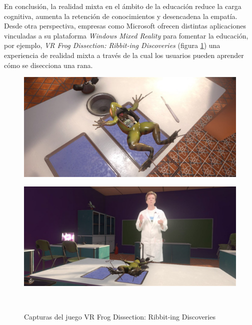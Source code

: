 En conclusión, la realidad mixta en el ámbito de la educación reduce la carga cognitiva, aumenta la retención de conocimientos y desencadena la empatía.\\




Desde otra perspectiva, empresas como Microsoft ofrecen distintas aplicaciones vinculadas a su plataforma \textit{Windows Mixed Reality} para fomentar la educación, por ejemplo, \textit{VR Frog Dissection: Ribbit-ing Discoveries} (figura \ref{fig:vrfrogdissectioncapturas}) una experiencia de realidad mixta a través de la cual los usuarios pueden aprender cómo se disecciona una rana.

\begin{figure}[htbp]
\centering
    \hspace{-4mm}
    \begin{minipage}{0.5\textwidth}
        \centering
        \includegraphics[scale=0.16]{Images/Estado del arte/frogDisection1.jpeg}\\
    \end{minipage}
    \begin{minipage}{0.5\textwidth}
        \centering
        \includegraphics[scale=0.16]{Images/Estado del arte/frogDisection2.jpeg}\\
    \end{minipage}\\
    \caption{Capturas del juego VR Frog Dissection: Ribbit-ing Discoveries}
    \label{fig:vrfrogdissectioncapturas}
\end{figure}

